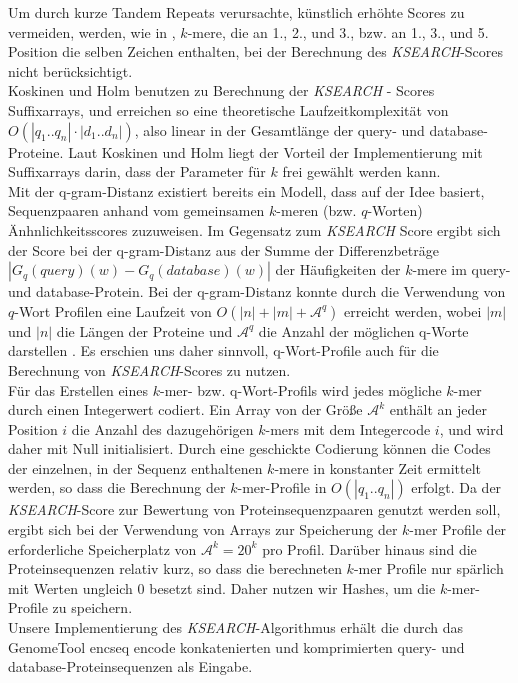 \documentclass{article}
\begin{document}
Um durch kurze Tandem Repeats verursachte, künstlich erhöhte Scores zu vermeiden, werden, wie in \cite{Holm}, $k$-mere, die an 1., 2., und 3., bzw. an 1., 3., und 5. Position die selben Zeichen enthalten, 
bei der Berechnung des \emph{KSEARCH}-Scores nicht berücksichtigt.\\
Koskinen und Holm benutzen zu Berechnung der \emph{KSEARCH} - Scores Suffixarrays, und erreichen so eine theoretische Laufzeitkomplexität von $O(|q_1..q_n| \cdot |d_1..d_n|)$, 
also linear in der Gesamtlänge der query- und database-Proteine. Laut Koskinen und Holm liegt der Vorteil der Implementierung mit Suffixarrays darin, dass der Parameter für $k$ frei gewählt werden kann. \\
Mit der q-gram-Distanz existiert bereits ein Modell, dass auf der Idee basiert,
Sequenzpaaren anhand vom gemeinsamen $k$-meren (bzw. $q$-Worten) Änhnlichkeits\-scores zuzuweisen. 
Im Gegensatz zum \emph{KSEARCH} Score ergibt sich der Score bei der q-gram-Distanz aus der Summe der Differenzbeträge $|G_q(query)(w) - G_q(database)(w)|$ der Häufigkeiten der $k$-mere im query- und 
database-Protein. 
Bei der q-gram-Distanz konnte durch die Verwendung von $q$-Wort Profilen eine
Laufzeit von $O(|n|+|m|+\mathcal{A}^q)$ erreicht werden, wobei $|m|$ und $|n|$
die Längen der Proteine und $\mathcal{A}^q$ die Anzahl der möglichen q-Worte
darstellen \cite{GSA}. Es erschien uns daher sinnvoll, q-Wort-Profile auch für die Berechnung von \emph{KSEARCH}-Scores zu nutzen.\\
Für das Erstellen eines $k$-mer- bzw. q-Wort-Profils wird jedes mögliche $k$-mer durch einen Integerwert codiert. Ein Array von der Größe $\mathcal{A}^k$ enthält an jeder Position $i$ die 
Anzahl des dazugehörigen $k$-mers mit dem Integercode $i$, und wird daher mit Null initialisiert. Durch eine geschickte Codierung können die Codes der einzelnen, in der Sequenz enthaltenen $k$-mere in 
konstanter Zeit ermittelt werden, so dass die Berechnung der $k$-mer-Profile in ${O(|q_1..q_n|)}$ erfolgt. Da der \emph{KSEARCH}-Score zur Bewertung von Proteinsequenzpaaren genutzt werden soll, 
ergibt sich bei der Verwendung von Arrays zur Speicherung der $k$-mer Profile der erforderliche Speicherplatz von $\mathcal{A}^k = 20^k$ pro Profil. Darüber hinaus sind die Proteinsequenzen relativ kurz, 
so dass die berechneten $k$-mer Profile nur spärlich mit Werten ungleich $0$ besetzt sind. Daher nutzen wir Hashes, um die $k$-mer-Profile zu speichern. \\
Unsere Implementierung des \emph{KSEARCH}-Algorithmus erhält die durch das GenomeTool encseq encode konkatenierten und komprimierten query- und database-Proteinsequenzen als Eingabe. 
\end{document}

